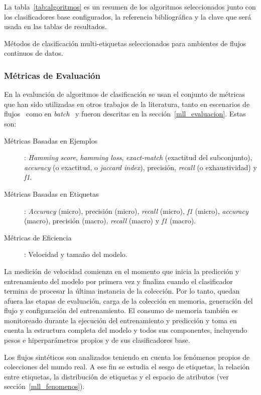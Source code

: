 La tabla~\ref{tab:algoritmos} es un resumen de los algoritmos seleccionados
junto con los clasificadores base configurados, la referencia bibliográfica y la
clave que será usada en las tablas de resultados.

\begin{table}[htbp]
	\centering
	\begin{adjustbox}{max width=\textwidth}
		
	\end{adjustbox}
	\caption{Métodos de clasificación multi-etiquetas seleccionados para ambientes
		de flujos continuos de datos.}
	\label{tab:algoritmos}
\end{table}

\subsubsection{Métricas de Evaluación}

En la evaluación de algoritmos de clasificación se usan el conjunto de métricas
que han sido utilizadas en otros trabajos de la literatura, tanto en escenarios
de
flujos~\cite{sousa_multi-label_2018,zheng_survey_2020,osojnik_multi-label_2017}
como en
\textit{batch}~\cite{madjarov_extensive_2012,zhang_multi-label_2010,gibaja_tutorial_2015}
y fueron descritas en la sección~\ref{mll_evaluacion}.  Estas son:

\begin{description}

	\item[Métricas Basadas en Ejemplos]: \textit{Hamming score}, \textit{hamming
		      loss}, \textit{exact-match} (exactitud del subconjunto),
	      \textit{accuracy} (o exactitud, o \textit{jaccard index}), precisión,
	      \textit{recall} (o exhaustividad) y \textit{f1}.

	\item[Métricas Basadas en Etiquetas]: \textit{Accuracy} (micro), precisión
	      (micro), \textit{recall} (micro), \textit{f1} (micro),
	      \textit{accuracy} (macro), precisión (macro), \textit{recall} (macro)
	      y \textit{f1} (macro).

	\item[Métricas de Eficiencia]: Velocidad y tamaño del modelo.

\end{description}

La medición de velocidad comienza en el momento que inicia la predicción y
entrenamiento del modelo por primera vez y finaliza cuando el clasificador
termina de procesar la última instancia de la colección. Por lo tanto, quedan
afuera las etapas de evaluación, carga de la colección en memoria, generación
del flujo y configuración del entrenamiento. El consumo de memoria también es
monitoreado durante la ejecución del entrenamiento y predicción y toma en cuenta
la estructura completa del modelo y todos sus componentes, incluyendo pesos e
hiperparámetros propios y de sus clasificadores base.

Los flujos sintéticos son analizados teniendo en cuenta los fenómenos propios de
colecciones del mundo real. A ese fin se estudia el sesgo de etiquetas, la
relación entre etiquetas, la distribución de etiquetas y el espacio de atributos
(ver sección~\ref{mll_fenomenos}).
